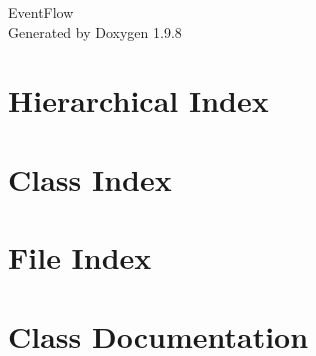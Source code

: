\documentclass[twoside]{book}
\newcommand{\+}{\discretionary{\mbox{\scriptsize$\hookleftarrow$}}{}{}}
\newcommand{\clearemptydoublepage}{%
    \newpage{\pagestyle{empty}\cleardoublepage}%
  }
\begin{document}
  \raggedbottom
    \hypersetup{pageanchor=false,
                bookmarksnumbered=true,
                pdfencoding=unicode
               }
  \begin{titlepage}
  \vspace*{7cm}
  \begin{center}%
  {\Large Event\+Flow}\\
  \vspace*{1cm}
  {\large Generated by Doxygen 1.9.8}\\
  \end{center}
  \end{titlepage}
  \clearemptydoublepage
  \tableofcontents
  \clearemptydoublepage
  \hypersetup{pageanchor=true}
\chapter{Hierarchical Index}

\chapter{Class Index}

\chapter{File Index}

\chapter{Class Documentation}























\end{document}
